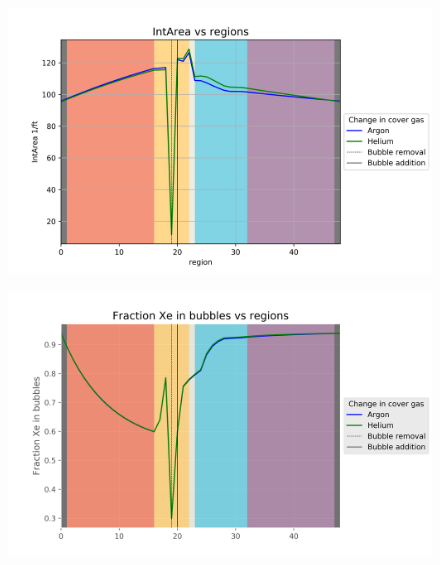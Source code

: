 \begin{figure}[p] 
\centering
\begin{minipage}{.5\textwidth}
  \centering
  \includegraphics[width=1.0\linewidth]{images/CoverGasIntArea.png}
  \label{fig:CoverGasIntAreaCon}
\end{minipage}%
\begin{minipage}{.5\textwidth}
  \centering
  \includegraphics[width=1.0\linewidth]{images/CoverGasFractionXeInBubbles.png}
  \label{fig:CoverGasPercentXe}
\end{minipage}
\end{figure}

\FloatBarrier
\newpage
\FloatBarrier

